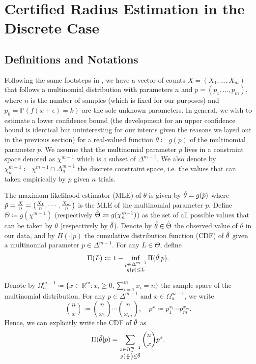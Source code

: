 \section{Certified Radius Estimation in the Discrete Case}\label{sec:discrete}

\subsection{Definitions and Notations}
Following the same footsteps in , we have a vector of counts $X = (X_1, \ldots, X_m)$ that follows a multinomial distribution with parameters $n$ and $p = (p_1, \ldots, p_m)$, where $n$ is the number of samples (which is fixed for our purposes) and $p_k = \mathbb{P}(f(x + \epsilon) = k)$ are the sole unknown parameters.
In general, we wish to estimate a lower confidence bound (the development for an upper confidence bound is identical but uninteresting for our intents given the reasons we layed out in the previous section) for a real-valued function $\theta\coloneqq g(p)$ of the multinomial parameter $p$.
We assume that the multinomial parameter $p$ lives in a constraint space denoted as $\chi^{m-1}$ which is a subset of $\Delta^{m-1}$.
We also denote by $\chi^{m-1}_n\coloneqq\chi^{m-1}\cap\Delta^{m-1}_n$ the discrete constraint space, i.e. the values that can taken empirically by $p$ given $n$ trials.

The maximum likelihood estimator (MLE) of $\theta$ is given by $\Hat{\theta}=g(\Hat{p})$ where $\Hat{p} = \frac{X}{n}=\left(\frac{X_1}{n}, \cdots, \frac{X_m}{n}\right)$ is the MLE of the multinomial parameter $p$.
Define $\Theta\coloneqq g(\chi^{m-1})$ (respectively $\Hat{\Theta}\coloneqq g(\chi^{m-1}_n)$) as the set of all possible values that can be taken by $\theta$ (respectively by $\Hat{\theta}$).
Denote by $\Tilde{\theta}\in\Hat{\Theta}$ the observed value of $\theta$ in our data, and by $\Pi(\cdot|p)$ the cumulative distribution function (CDF) of $\Hat{\theta}$ given a multinomial parameter $p\in\Delta^{m-1}$.
For any $L\in\Theta$, define
\begin{equation}
    \Pi(L)\coloneqq1-\inf_{\substack{p\in\Delta^{m-1}\\g(p)\leq L}}\Pi(\Tilde{\theta}|p).\label{eq:Pi}
\end{equation}

Denote by $\Omega^{m-1}_n\coloneqq\{x\in\mathbb{R}^m : x_i\geq0,\sum_{i=1}^m x_i = n\}$ the sample space of the multinomial distribution.
For any $p\in\Delta^{m-1}$ and $x\in\Omega^{m-1}_n$, we write
\[
    \binom{n}{x}\coloneqq\binom{n}{x_1}\cdots\binom{n}{x_m},\quad p^x\coloneqq p_1^{x_1}\cdots p_m^{x_m}.
\]
Hence, we can explicitly write the CDF of $\Hat{\theta}$ as
\[
    \Pi(\Tilde{\theta}|p) = \sum_{\substack{x\in\Omega^{m-1}_n\\g\left(\frac{x}{n}\right)\leq\Tilde{\theta}}}\binom{n}{x}p^x.
\]

